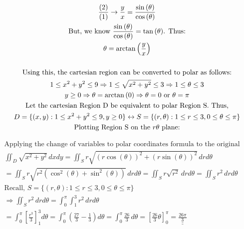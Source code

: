 \documentclass[letterpaper,10pt]{article}
\newcommand{\doubleu}[1]{\underline{\underline{#1}}}
\begin{document}
\begin{center}
\begin{gather*}
				\frac{\text(2)}{\text{(1)}} \rightarrow \frac{y}{x} = \frac{\sin{(\theta)}}{\cos{(\theta)}} \\
				\text{But, we know $\frac{\sin{(\theta)}}{\cos{(\theta)}} = \tan{(\theta)}$. Thus:} \\
				\theta = \arctan{\left( \frac{y}{x} \right)} \\
				\\
				\text{Using this, the cartesian region can be converted to polar as follows:} \\
				1 \leq x^2+y^2 \leq 9 \Rightarrow 1 \leq \sqrt{x^2+y^2} \leq 3 \Rightarrow 1 \leq \theta \leq 3 \\
				y \geq 0 \Rightarrow \theta = \arctan{(0)} \Rightarrow \theta = 0 \text{ or } \theta = \pi \\
				\text{Let the cartesian Region D be equivalent to polar Region S. Thus,} \\
				D = \{ (x,y): 1 \leq x^2 + y^2 \leq 9, y \geq 0 \} \leftrightarrow S = \{ (r,\theta): 1 \leq r \leq 3, 0 \leq \theta \leq \pi \} \\
				\text{Plotting Region S on the $r\theta$ plane:}
			\end{gather*}
			\begin{gather*}
				\text{Applying the change of variables to polar coordinates formula to the original integral:} \\
				\iint_D \sqrt{x^2+y^2} \, dxdy = \iint_S r \sqrt{(r\cos(\theta))^2 + (r \sin (\theta))^2} \, drd\theta \\
				= \iint_S r \sqrt{r^2(\cos^2(\theta) + \sin^2(\theta))} \, drd\theta = \iint_S r \sqrt{r^2} \, drd\theta = \iint_S r^2 \, drd\theta \\
				\text{Recall, } S = \{ (r, \theta): 1 \leq r \leq 3, 0 \leq \theta \leq \pi \} \\
				\Rightarrow \iint_S r^2 \, drd\theta = \int_0^\pi \int_1^3 r^2 \, drd\theta \\
				= \int_0^\pi \left[ \frac{r^3}{3} \right]^3_1 d\theta = \int_0^\pi \left( \frac{27}{3} - \frac{1}{3} \right) d\theta = \int_0^\pi \frac{26}{3} \, d\theta = \left[ \frac{26}{3}\theta \right]_0^\pi = \doubleu{\frac{26\pi}{3}}
			\end{gather*}
			\end{center}
\end{document}
